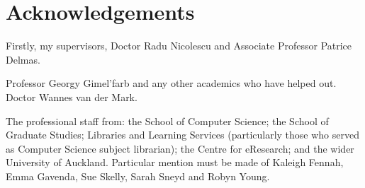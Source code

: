 \chapter*{Acknowledgements}


Firstly, my supervisors, Doctor Radu Nicolescu and Associate Professor Patrice Delmas.

Professor Georgy Gimel'farb and any other academics who have helped out.  Doctor Wannes van der Mark.

The professional staff from: the School of Computer Science; the School of Graduate Studies; Libraries and Learning Services (particularly those who served as Computer Science subject librarian); the Centre for eResearch; and the wider University of Auckland.  Particular mention must be made of Kaleigh Fennah, Emma Gavenda, Sue Skelly, Sarah Sneyd and Robyn Young.





